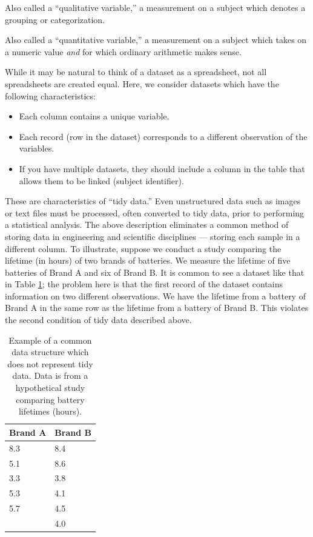 \documentclass[]{book}
\providecommand{\tightlist}{%
  \setlength{\itemsep}{0pt}\setlength{\parskip}{0pt}}
\theoremstyle{plain}
\theoremstyle{mydefn}
\theoremstyle{myexmpl}
\theoremstyle{remark}
\let\BeginKnitrBlock\begin \let\EndKnitrBlock\end
\let\BeginKnitrBlock\begin \let\EndKnitrBlock\end
\begin{document}
\BeginKnitrBlock{definition}[Categorical Variable]
\protect\hypertarget{def:defn-categorical}{}{\label{def:defn-categorical}
{} }Also called a ``qualitative
variable,'' a measurement on a subject which denotes a grouping or
categorization.
\EndKnitrBlock{definition}

\BeginKnitrBlock{definition}[Numeric Variable]
\protect\hypertarget{def:defn-numeric}{}{\label{def:defn-numeric}
{} }Also called a ``quantitative
variable,'' a measurement on a subject which takes on a numeric value
\emph{and} for which ordinary arithmetic makes sense.
\EndKnitrBlock{definition}

While it may be natural to think of a dataset as a spreadsheet, not all
spreadsheets are created equal. Here, we consider datasets which have
the following characteristics:

\begin{itemize}
\tightlist
\item
  Each column contains a unique variable.
\item
  Each record (row in the dataset) corresponds to a different
  observation of the variables.
\item
  If you have multiple datasets, they should include a column in the
  table that allows them to be linked (subject identifier).
\end{itemize}

These are characteristics of ``tidy data.'' Even unstructured data such
as images or text files must be processed, often converted to tidy data,
prior to performing a statistical analysis. The above description
eliminates a common method of storing data in engineering and scientific
disciplines --- storing each sample in a different column. To
illustrate, suppose we conduct a study comparing the lifetime (in hours)
of two brands of batteries. We measure the lifetime of five batteries of
Brand A and six of Brand B. It is common to see a dataset like that in
Table \ref{tab:basics-poor-dataset}; the problem here is that the first
record of the dataset contains information on two different
observations. We have the lifetime from a battery of Brand A in the same
row as the lifetime from a battery of Brand B. This violates the second
condition of tidy data described above.

\begin{table}

\caption{\label{tab:basics-poor-dataset}Example of a common data structure which does not represent tidy data.  Data is from a hypothetical study comparing battery lifetimes (hours).}
\centering
\begin{tabular}[t]{l|l}
\hline
Brand A & Brand B\\
\hline
8.3 & 8.4\\
\hline
5.1 & 8.6\\
\hline
3.3 & 3.8\\
\hline
5.3 & 4.1\\
\hline
5.7 & 4.5\\
\hline
 & 4.0\\
\hline
\end{tabular}
\end{table}
\end{document}
